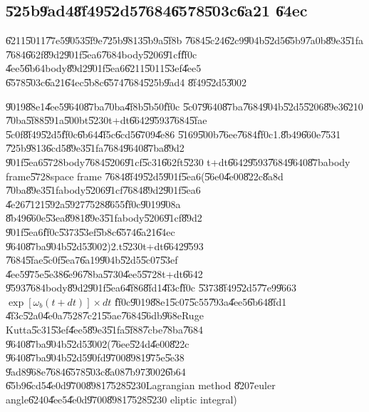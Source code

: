 \documentclass[12pt,a4paper]{article}
\begin{document}
\subsection{\U{525b}\U{9ad4}\U{8f49}\U{52d5}\U{7684}\U{6578}\U{503c}\U{6a21}%
\U{64ec}}

\U{6211}\U{5011}\U{77e5}\U{9053}\U{5f9e}\U{725b}\U{9813}\U{5b9a}\U{5f8b}%
\U{7684}\U{5c24}\U{62c9}\U{904b}\U{52d5}\U{65b9}\U{7a0b}\U{89e3}\U{51fa}%
\U{7684}\U{662f}\U{89d2}\U{901f}\U{5ea6}\U{7684}body\U{5206}\U{91cf}\U{ff0c}%
\U{4ee5}\U{6b64}body\U{89d2}\U{901f}\U{5ea6}\U{6211}\U{5011}\U{53ef}\U{4ee5}%
\U{6578}\U{503c}\U{6a21}\U{64ec}\U{5b8c}\U{6574}\U{7684}\U{525b}\U{9ad4}%
\U{8f49}\U{52d5}\U{3002}

\U{9019}\U{88e1}\U{4ee5}\U{9640}\U{87ba}\U{70ba}\U{4f8b}\U{5b50}\U{ff0c}%
\U{5c07}\U{9640}\U{87ba}\U{7684}\U{904b}\U{52d5}\U{5206}\U{89e3}\U{6210}%
\U{70ba}\U{5f88}\U{591a}\U{500b}t\U{5230}t+dt\U{6642}\U{9593}\U{7684}\U{5fae}%
\U{5c0f}\U{8f49}\U{52d5}\U{ff0c}\U{6b64}\U{4f5c}\U{6cd5}\U{6709}\U{4e86}%
\U{5169}\U{500b}\U{76ee}\U{7684}\U{ff0c}1.\hfill \U{8b49}\U{660e}\U{7531}%
\U{725b}\U{9813}\U{6cd5}\U{89e3}\U{51fa}\U{7684}\U{9640}\U{87ba}\U{89d2}%
\U{901f}\U{5ea6}\U{5728}body\U{7684}\U{5206}\U{91cf}\U{5c31}\U{662f}t\U{5230}%
t+dt\U{6642}\U{9593}\U{7684}\U{9640}\U{87ba}body frame\U{5728}space frame%
\U{7684}\U{8f49}\U{52d5}\U{901f}\U{5ea6}(\U{56e0}\U{4e00}\U{822c}\U{8a8d}%
\U{70ba}\U{89e3}\U{51fa}body\U{5206}\U{91cf}\U{7684}\U{89d2}\U{901f}\U{5ea6}%
\U{4e26}\U{7121}\U{592a}\U{5927}\U{7528}\U{8655}\U{ff0c}\U{9019}\U{908a}%
\U{8b49}\U{660e}\U{53ea}\U{8981}\U{89e3}\U{51fa}body\U{5206}\U{91cf}\U{89d2}%
\U{901f}\U{5ea6}\U{ff0c}\U{5373}\U{53ef}\U{5b8c}\U{6574}\U{6a21}\U{64ec}%
\U{9640}\U{87ba}\U{904b}\U{52d5}\U{3002})2.t\U{5230}t+dt\U{6642}\U{9593}%
\U{7684}\U{5fae}\U{5c0f}\U{5ea7}\U{6a19}\U{904b}\U{52d5}\U{5c07}\U{53ef}%
\U{4ee5}\U{975e}\U{5e38}\U{6e96}\U{78ba}\U{5730}\U{4ee5}\U{5728}t+dt\U{6642}%
\U{9593}\U{7684}body\U{89d2}\U{901f}\U{5ea6}\U{4f86}\U{8fd1}\U{4f3c}\U{ff0c}%
\U{5373}\U{8f49}\U{52d5}\U{77e9}\U{9663}$\exp [\omega _{b}(t+dt)]\times dt$%
\U{ff0c}\U{9019}\U{88e1}\U{5c07}\U{5c55}\U{793a}\U{4ee5}\U{6b64}\U{8fd1}%
\U{4f3c}\U{52a0}\U{4e0a}\U{7528}\U{7c21}\U{55ae}\U{7684}\U{56db}\U{968e}Ruge
Kutta\U{5c31}\U{53ef}\U{4ee5}\U{89e3}\U{51fa}\U{5f88}\U{7cbe}\U{78ba}\U{7684}%
\U{9640}\U{87ba}\U{904b}\U{52d5}\U{3002}(\U{76ee}\U{524d}\U{4e00}\U{822c}%
\U{9640}\U{87ba}\U{904b}\U{52d5}\U{90fd}\U{9700}\U{8981}\U{975e}\U{5e38}%
\U{9ad8}\U{968e}\U{7684}\U{6578}\U{503c}\U{8a08}\U{7b97}\U{3002}\U{6b64}%
\U{65b9}\U{6cd5}\U{4e0d}\U{9700}\U{8981}\U{7528}\U{5230}Lagrangian method%
\U{8207}euler angle\U{6240}\U{4ee5}\U{4e0d}\U{9700}\U{8981}\U{7528}\U{5230}%
eliptic integral)
\end{document}

